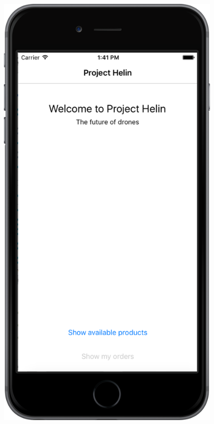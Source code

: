 \begin{figure}[H]
	\hfill
	\begin{minipage}[b]{0.2\textwidth}
		\centering
		\includegraphics[width=\textwidth]{images/customer-app-ios.png}
		\label{fig:customer-app-ios}
	\end{minipage}

\end{figure}
